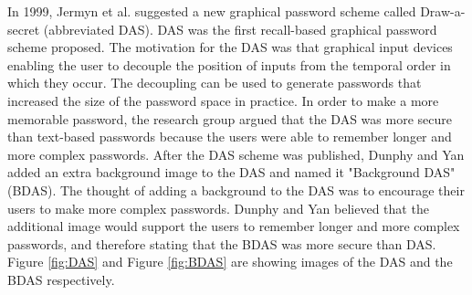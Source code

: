     \begin{figure}[H]
      \centering
    \end{figure}

  In 1999, Jermyn et al. \cite{Jermyn} suggested a new graphical password scheme called Draw-a-secret (abbreviated DAS). DAS was the first recall-based graphical password scheme proposed. The motivation for the DAS was that graphical input devices enabling the user to decouple the position of inputs from the temporal order in which they occur. The decoupling can be used to generate passwords that increased the size of the password space in practice. In order to make a more memorable password, the research group argued that the DAS was more secure than text-based passwords because the users were able to remember longer and more complex passwords. After the DAS scheme was published, Dunphy and Yan \cite{BDAS} added an extra background image to the DAS and named it "Background DAS" (BDAS). The thought of adding a background to the DAS was to encourage their users to make more complex passwords. Dunphy and Yan believed that the additional image would support the users to remember longer and more complex passwords, and therefore stating that the BDAS was more secure than DAS. Figure \ref{fig:DAS} and Figure \ref{fig:BDAS} are showing images of the DAS and the BDAS respectively.

